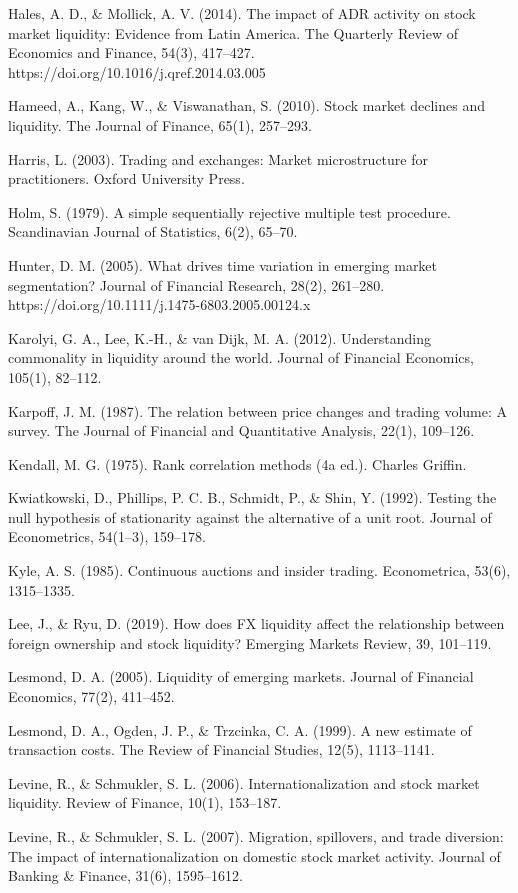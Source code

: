 \begin{referencias}
Hales, A. D., \& Mollick, A. V. (2014). The impact of ADR activity on stock market liquidity: Evidence from Latin America. The Quarterly Review of Economics and Finance, 54(3), 417--427. https://doi.org/10.1016/j.qref.2014.03.005

Hameed, A., Kang, W., \& Viswanathan, S. (2010). Stock market declines and liquidity. The Journal of Finance, 65(1), 257--293.

Harris, L. (2003). Trading and exchanges: Market microstructure for practitioners. Oxford University Press.

Holm, S. (1979). A simple sequentially rejective multiple test procedure. Scandinavian Journal of Statistics, 6(2), 65--70.

Hunter, D. M. (2005). What drives time variation in emerging market segmentation? Journal of Financial Research, 28(2), 261--280. https://doi.org/10.1111/j.1475-6803.2005.00124.x

Karolyi, G. A., Lee, K.-H., \& van Dijk, M. A. (2012). Understanding commonality in liquidity around the world. Journal of Financial Economics, 105(1), 82--112.

Karpoff, J. M. (1987). The relation between price changes and trading volume: A survey. The Journal of Financial and Quantitative Analysis, 22(1), 109--126.

Kendall, M. G. (1975). Rank correlation methods (4a ed.). Charles Griffin.

Kwiatkowski, D., Phillips, P. C. B., Schmidt, P., \& Shin, Y. (1992). Testing the null hypothesis of stationarity against the alternative of a unit root. Journal of Econometrics, 54(1--3), 159--178.

Kyle, A. S. (1985). Continuous auctions and insider trading. Econometrica, 53(6), 1315--1335.

Lee, J., \& Ryu, D. (2019). How does FX liquidity affect the relationship between foreign ownership and stock liquidity? Emerging Markets Review, 39, 101--119.

Lesmond, D. A. (2005). Liquidity of emerging markets. Journal of Financial Economics, 77(2), 411--452.

Lesmond, D. A., Ogden, J. P., \& Trzcinka, C. A. (1999). A new estimate of transaction costs. The Review of Financial Studies, 12(5), 1113--1141.

Levine, R., \& Schmukler, S. L. (2006). Internationalization and stock market liquidity. Review of Finance, 10(1), 153--187.

Levine, R., \& Schmukler, S. L. (2007). Migration, spillovers, and trade diversion: The impact of internationalization on domestic stock market activity. Journal of Banking \& Finance, 31(6), 1595--1612.


\end{referencias}
